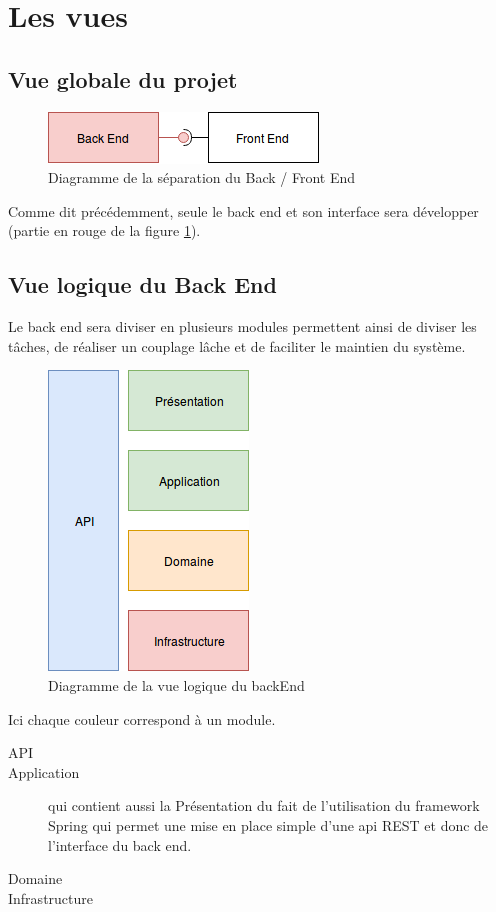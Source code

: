 \documentclass{article}
\begin{document}
\section{Les vues}
\subsection{Vue globale du projet}

\begin{figure}[h]
    \centering
    \includegraphics[]{img/Diagramme_sep_Back_Front.png}
    \caption{Diagramme de la séparation du Back / Front End}
    \label{fig:diag_back_front}
\end{figure}
Comme dit précédemment, seule le back end et son interface sera développer (partie en rouge de la figure \ref{fig:diag_back_front}).

\clearpage
\subsection{Vue logique du Back End}
Le back end sera diviser en plusieurs modules permettent ainsi de diviser les tâches, de réaliser un couplage lâche et de faciliter le maintien du système.
\begin{figure}[h]
    \centering
    \includegraphics[]{img/Vue_logique_back.png}
    \caption{Diagramme de la vue logique du backEnd}
\end{figure}

Ici chaque couleur correspond à un module.

\begin{description}
    \item [API]
    \item [Application] qui contient aussi la Présentation du fait de l'utilisation du framework Spring qui permet une mise en place simple d'une api \acrshort{REST} et donc de l'interface du back end. 
    \item [Domaine]
    \item [Infrastructure]
\end{description}


\clearpage
\printglossary[type=\acronymtype, title=Acronymes]
\end{document}
